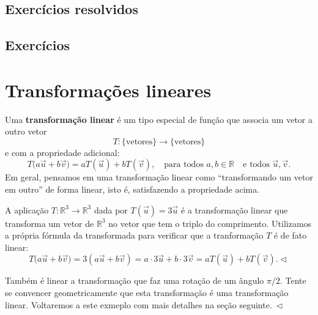 \subsection*{Exercícios resolvidos}

\construirExeresol

\subsection*{Exercícios}

\construirExer


\section{Transformações lineares}


Uma \textbf{transformação linear} é um tipo especial de função que associa um vetor a outro vetor
\begin{equation}
T: \{ \text{vetores} \} \to \{ \text{vetores} \}
\end{equation} e com a propriedade adicional:
\begin{equation}
T\big( a \vec{u} + b \vec{v} \big) = aT(\vec{u}) + bT(\vec{v}), \quad \text{para todos } a, b \in \mathbb{R} \quad \text{e todos } \vec{u}, \vec{v}.
\end{equation}
Em geral, pensamos em uma transformação linear como ``transformando um vetor em outro'' de forma linear, isto é, satisfazendo a propriedade acima.


\begin{ex}
A aplicação $T: \mathbb{R}^3 \to \mathbb{R}^3$ dada por $T(\vec{u}) = 3\vec{u}$ é a transformação linear que transforma um vetor de $\mathbb{R}^3$ no vetor que tem o triplo do comprimento. Utilizamos a própria fórmula da transformada para verificar que a tranformação $T$ é de fato linear:
\begin{equation}
T\big( a \vec{u} + b \vec{v} \big) = 3 ( a \vec{u} + b \vec{v} ) = a \cdot 3 \vec{u} + b \cdot 3 \vec{v} = aT(\vec{u}) + bT(\vec{v}). \lhd
\end{equation}
\end{ex}


\begin{ex}\label{exp:4}
Também é linear a transformação que faz uma rotação de um ângulo $\pi / 2$. Tente se convencer geometricamente que esta transformação é uma transformação linear. Voltaremos a este exmeplo com mais detalhes na seção seguinte$. \ \lhd$
\end{ex}



